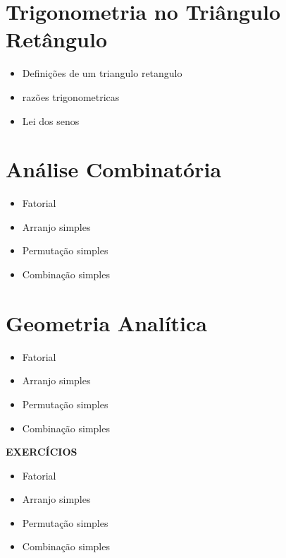 \documentclass[11pt,fleqn]{book} %
\begin{document}
\section{Trigonometria no Triângulo Retângulo}

\begin{itemize}
	\item   Definições de um triangulo retangulo
	\item razões trigonometricas
	\item Lei dos senos
\end{itemize}

\section{Análise Combinatória}%
\begin{itemize}
	\item Fatorial
	\item Arranjo simples
	\item Permutação simples
	\item Combinação simples
\end{itemize}

\section{Geometria Analítica}%
\begin{itemize}
	\item Fatorial
	\item Arranjo simples
	\item Permutação simples
	\item Combinação simples
\end{itemize}

\begin{center}
\textbf{EXERCÍCIOS}
    
\end{center}
	\begin{itemize}
		\item Fatorial
		\item Arranjo simples
		\item Permutação simples
		\item Combinação simples
	\end{itemize}
\end{document}
